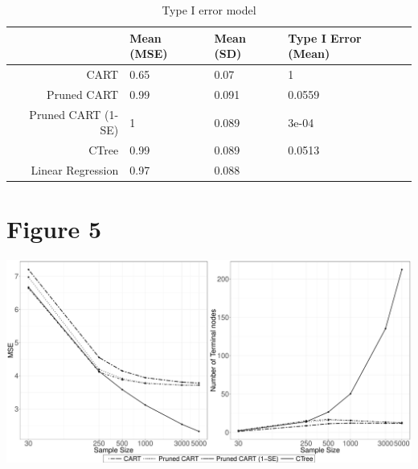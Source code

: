 \documentclass{article}
\begin{document}
\begin{table}[ht]
\centering
\begin{tabular}{rlll}
  \hline
 & Mean (MSE) & Mean (SD) & Type I Error (Mean) \\ 
  \hline
CART & 0.65 & 0.07 & 1 \\ 
  Pruned CART & 0.99 & 0.091 & 0.0559 \\ 
  Pruned CART (1-SE) & 1 & 0.089 & 3e-04 \\ 
  CTree & 0.99 & 0.089 & 0.0513 \\ 
  Linear Regression & 0.97 & 0.088 &  \\ 
   \hline
\end{tabular}
\caption{Type I error model} 
\end{table}

\section*{Figure 5}
\includegraphics{code_for_tables-010}
\end{document}
